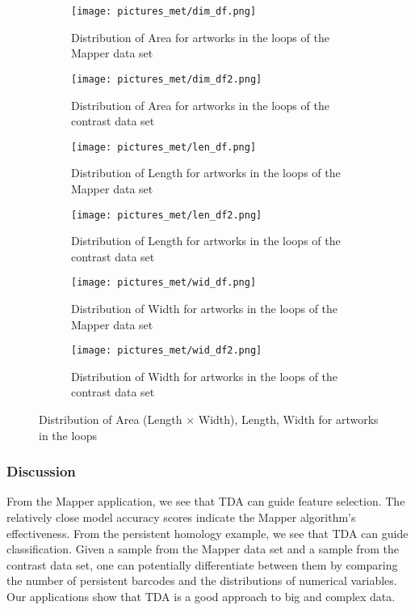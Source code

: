 \documentclass[12pt]{article}
\theoremstyle{definition}
\begin{document}
\begin{figure}[H]
\centering
\begin{subfigure}{.5\textwidth}
  \centering
  \texttt{[image: pictures\_met/dim\_df.png]} 
  \caption{Distribution of Area for artworks in the loops of the Mapper data set}
  \label{fig 5:sub1} 
\end{subfigure}%
\begin{subfigure}{.5\textwidth}
  \centering
  \texttt{[image: pictures\_met/dim\_df2.png]} 
  \caption{Distribution of Area for artworks in the loops of the contrast data set}
  \label{fig 5:sub2}
\end{subfigure}
\begin{subfigure}{.5\textwidth}
  \centering
  \texttt{[image: pictures\_met/len\_df.png]} 
  \caption{Distribution of Length for artworks in the loops of the Mapper data set}
  \label{fig 5:sub3} 
\end{subfigure}%
\begin{subfigure}{.5\textwidth}
  \centering
  \texttt{[image: pictures\_met/len\_df2.png]} 
  \caption{Distribution of Length for artworks in the loops of the contrast data set}
  \label{fig 5:sub4}
\end{subfigure}
\begin{subfigure}{.5\textwidth}
  \centering
  \texttt{[image: pictures\_met/wid\_df.png]} 
  \caption{Distribution of Width for artworks in the loops of the Mapper data set}
  \label{fig 5:sub5} 
\end{subfigure}%
\begin{subfigure}{.5\textwidth}
  \centering
  \texttt{[image: pictures\_met/wid\_df2.png]} 
  \caption{Distribution of Width for artworks in the loops of the contrast data set}
  \label{fig 5:sub6}
\end{subfigure}
\caption{Distribution of Area (Length $\times$ Width), Length, Width for artworks in the loops}
\label{dims}
\end{figure}
\subsubsection{Discussion}
From the Mapper application, we see that TDA can guide feature selection. The relatively close model accuracy scores indicate the Mapper algorithm's effectiveness. From the persistent homology example, we see that TDA can guide classification. Given a sample from the Mapper data set and a sample from the contrast data set, one can potentially differentiate between them by comparing the number of persistent barcodes and the distributions of numerical variables. Our applications show that TDA is a good approach to big and complex data.
\end{document}
